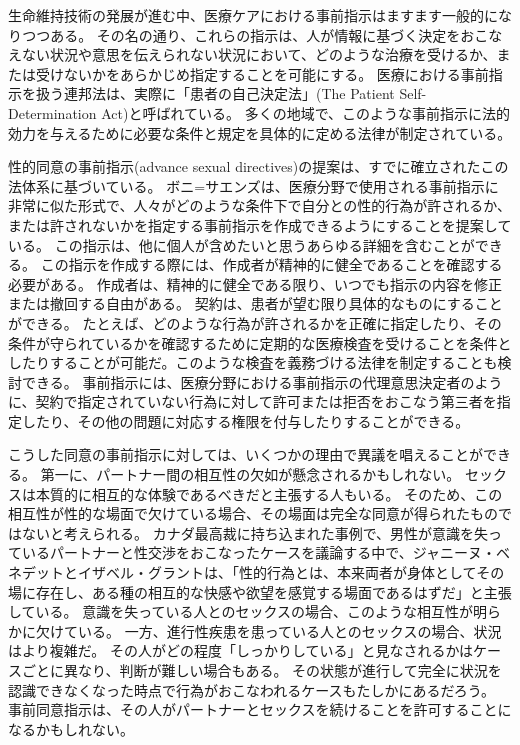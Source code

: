 \documentclass[paper=a4,book,openany]{jlreq}
\begin{document}
生命維持技術の発展が進む中、医療ケアにおける事前指示はますます一般的になりつつある。
その名の通り、これらの指示は、人が情報に基づく決定をおこなえない状況や意思を伝えられない状況において、どのような治療を受けるか、または受けないかをあらかじめ指定することを可能にする。
医療における事前指示を扱う連邦法は、実際に「患者の自己決定法」(The Patient Self-Determination Act)と呼ばれている。
多くの地域で、このような事前指示に法的効力を与えるために必要な条件と規定を具体的に定める法律が制定されている\citep[cf.][]{srebnik99:_advan_direc_mental_healt_treat}。

性的同意の事前指示(advance sexual directives)の提案は、すでに確立されたこの法体系に基づいている。
ボニ=サエンズは、医療分野で使用される事前指示に非常に似た形式で、人々がどのような条件下で自分との性的行為が許されるか、または許されないかを指定する事前指示を作成できるようにすることを提案している\citep{boni-saenz15:_sexual_incap}。
この指示は、他に個人が含めたいと思うあらゆる詳細を含むことができる。
この指示を作成する際には、作成者が精神的に健全であることを確認する必要がある。
作成者は、精神的に健全である限り、いつでも指示の内容を修正または撤回する自由がある。
契約は、患者が望む限り具体的なものにすることができる。
たとえば、どのような行為が許されるかを正確に指定したり、その条件が守られているかを確認するために定期的な医療検査を受けることを条件としたりすることが可能だ。このような検査を義務づける法律を制定することも検討できる。
事前指示には、医療分野における事前指示の代理意思決定者のように、契約で指定されていない行為に対して許可または拒否をおこなう第三者を指定したり、その他の問題に対応する権限を付与したりすることができる。

こうした同意の事前指示に対しては、いくつかの理由で異議を唱えることができる。
第一に、パートナー間の相互性の欠如が懸念されるかもしれない。
セックスは本質的に相互的な体験であるべきだと主張する人もいる。
そのため、この相互性が性的な場面で欠けている場合、その場面は完全な同意が得られたものではないと考えられる。
カナダ最高裁に持ち込まれた事例で、男性が意識を失っているパートナーと性交渉をおこなったケースを議論する中で、ジャニーヌ・ベネデットとイザベル・グラントは、「性的行為とは、本来両者が身体としてその場に存在し、ある種の相互的な快感や欲望を感覚する場面であるはずだ」と主張している\citep[p.80]{benedet10:confusing}。
意識を失っている人とのセックスの場合、このような相互性が明らかに欠けている。
一方、進行性疾患を患っている人とのセックスの場合、状況はより複雑だ。
その人がどの程度「しっかりしている」と見なされるかはケースごとに異なり、判断が難しい場合もある。
その状態が進行して完全に状況を認識できなくなった時点で行為がおこなわれるケースもたしかにあるだろう。
事前同意指示は、その人がパートナーとセックスを続けることを許可することになるかもしれない。
\end{document}
